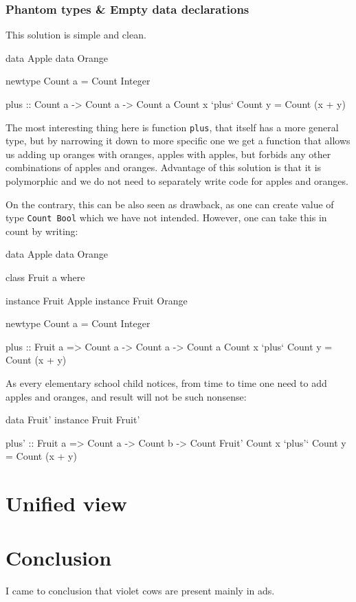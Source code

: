 \documentclass[11pt,oneside,draft]{fithesis2}
\begin{document}
\subsection{Phantom types \& Empty data declarations}

This solution is simple and clean.
\begin{code}
data Apple
data Orange

newtype Count a = Count Integer

plus :: Count a -> Count a -> Count a
Count x `plus` Count y = Count (x + y)
\end{code}
The most interesting thing here is function \texttt{plus}, that itself has a more general type, but
by narrowing it down to more specific one we get a function that allows us
adding up oranges with oranges, apples with apples, but forbids any other combinations
of apples and oranges. Advantage of this solution is that it is polymorphic
and we do not need to separately write code for apples and oranges.

On the contrary, this can be also seen as drawback, as one can create value
of type \texttt{Count Bool} which we have not intended. However,
one can take this in count by writing:
\begin{code}
data Apple
data Orange

class Fruit a where

instance Fruit Apple
instance Fruit Orange

newtype Count a = Count Integer

plus :: Fruit a => Count a -> Count a -> Count a
Count x `plus` Count y = Count (x + y)
\end{code}

As every elementary school child notices, from time to time one need to add apples and oranges,
and result will not be such nonsense:
\begin{code}
data Fruit'
instance Fruit Fruit'

plus' :: Fruit a => Count a -> Count b -> Count Fruit'
Count x `plus'` Count y = Count (x + y)
\end{code}

\chapter{Unified view}


\chapter{Conclusion}

I came to conclusion that violet cows are present mainly in ads.

%


\end{document}
